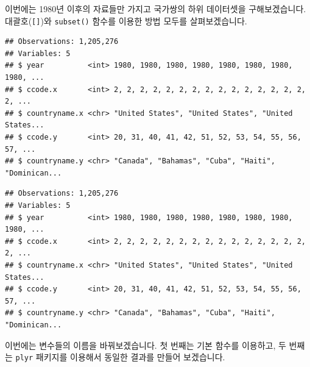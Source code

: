 \documentclass[]{book}
\newenvironment{Shaded}{\begin{snugshade}}{\end{snugshade}}
\newcommand{\CommentTok}[1]{\textcolor[rgb]{0.56,0.35,0.01}{\textit{#1}}}
\newcommand{\DecValTok}[1]{\textcolor[rgb]{0.00,0.00,0.81}{#1}}
\newcommand{\KeywordTok}[1]{\textcolor[rgb]{0.13,0.29,0.53}{\textbf{#1}}}
\newcommand{\NormalTok}[1]{#1}
\newcommand{\OperatorTok}[1]{\textcolor[rgb]{0.81,0.36,0.00}{\textbf{#1}}}
\newcommand{\StringTok}[1]{\textcolor[rgb]{0.31,0.60,0.02}{#1}}
\begin{document}
이번에는 1980년 이후의 자료들만 가지고 국가쌍의 하위 데이터셋을 구해보겠습니다. 대괄호(\texttt{{[}{]}})와 \texttt{subset()} 함수를 이용한 방법 모두를 살펴보겠습니다.

\begin{Shaded}
\end{Shaded}

\begin{verbatim}
## Observations: 1,205,276
## Variables: 5
## $ year          <int> 1980, 1980, 1980, 1980, 1980, 1980, 1980, 1980, ...
## $ ccode.x       <int> 2, 2, 2, 2, 2, 2, 2, 2, 2, 2, 2, 2, 2, 2, 2, 2, ...
## $ countryname.x <chr> "United States", "United States", "United States...
## $ ccode.y       <int> 20, 31, 40, 41, 42, 51, 52, 53, 54, 55, 56, 57, ...
## $ countryname.y <chr> "Canada", "Bahamas", "Cuba", "Haiti", "Dominican...
\end{verbatim}

\begin{Shaded}
\end{Shaded}

\begin{verbatim}
## Observations: 1,205,276
## Variables: 5
## $ year          <int> 1980, 1980, 1980, 1980, 1980, 1980, 1980, 1980, ...
## $ ccode.x       <int> 2, 2, 2, 2, 2, 2, 2, 2, 2, 2, 2, 2, 2, 2, 2, 2, ...
## $ countryname.x <chr> "United States", "United States", "United States...
## $ ccode.y       <int> 20, 31, 40, 41, 42, 51, 52, 53, 54, 55, 56, 57, ...
## $ countryname.y <chr> "Canada", "Bahamas", "Cuba", "Haiti", "Dominican...
\end{verbatim}

이번에는 변수들의 이름을 바꿔보겠습니다. 첫 번째는 기본 함수를 이용하고, 두 번째는 \texttt{plyr} 패키지를 이용해서 동일한 결과를 만들어 보겠습니다.
\end{document}
